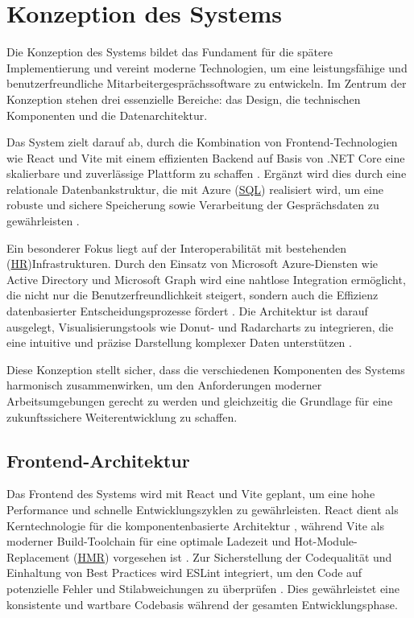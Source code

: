 \chapter{Konzeption des Systems} \label{chap:konzeption}

Die Konzeption des Systems bildet das Fundament für die spätere Implementierung und vereint moderne Technologien, um eine leistungsfähige und benutzerfreundliche Mitarbeitergesprächssoftware zu entwickeln. Im Zentrum der Konzeption stehen drei essenzielle Bereiche: das Design, die technischen Komponenten und die Datenarchitektur.

Das System zielt darauf ab, durch die Kombination von Frontend-Technologien wie React und Vite mit einem effizienten Backend auf Basis von .NET Core eine skalierbare und zuverlässige Plattform zu schaffen \cite{kirk2016data, microsoftDotNet}. Ergänzt wird dies durch eine relationale Datenbankstruktur, die mit Azure (\hyperref[abkuerzungen]{SQL}) realisiert wird, um eine robuste und sichere Speicherung sowie Verarbeitung der Gesprächsdaten zu gewährleisten \cite{azureDocumentation}.

Ein besonderer Fokus liegt auf der Interoperabilität mit bestehenden (\hyperref[abkuerzungen]{HR})\-\hspace{0pt}Infrastrukturen. Durch den Einsatz von
 Microsoft Azure-Diensten wie Active Directory und Microsoft Graph wird eine nahtlose Integration ermöglicht, die nicht nur die Benutzerfreundlichkeit steigert, sondern auch die Effizienz datenbasierter Entscheidungsprozesse fördert \cite{microsoftAzure}. Die Architektur ist darauf ausgelegt, Visualisierungstools wie Donut- und Radarcharts zu integrieren, die eine intuitive und präzise Darstellung komplexer Daten unterstützen \cite{evergreen2016effective}.

Diese Konzeption stellt sicher, dass die verschiedenen Komponenten des Systems harmonisch zusammenwirken, um den Anforderungen moderner Arbeitsumgebungen gerecht zu werden und gleichzeitig die Grundlage für eine zukunftssichere Weiterentwicklung zu schaffen.

\section{Frontend-Architektur} Das Frontend des Systems wird mit React und Vite geplant, um eine hohe Performance und schnelle Entwicklungszyklen zu gewährleisten. React dient als Kerntechnologie für die komponentenbasierte Architektur \cite{facebook2021react}, während Vite als moderner Build-Toolchain für eine optimale Ladezeit und Hot-Module-Replacement (\hyperref[abkuerzungen]{HMR}) vorgesehen ist \cite{vite2022docs}. Zur Sicherstellung der Codequalität und Einhaltung von Best Practices wird ESLint integriert, um den Code auf potenzielle Fehler und Stilabweichungen zu überprüfen \cite{eslint2022guide}. Dies gewährleistet eine konsistente und wartbare Codebasis während der gesamten Entwicklungsphase.

